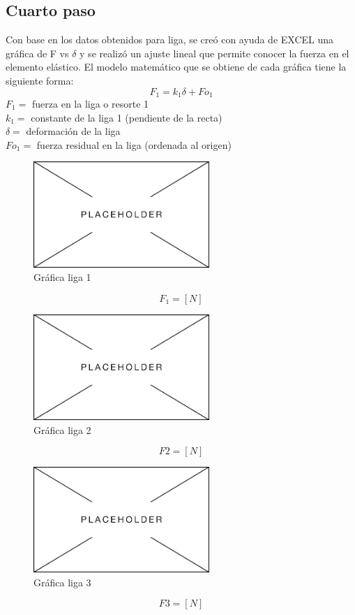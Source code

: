 \documentclass[12pt, titlepage]{report}
\begin{document}
    \subsection*{Cuarto paso}
    Con base en los datos obtenidos para liga, se creó con ayuda de EXCEL una gráfica de F vs $\delta$ y se realizó un ajuste lineal que permite conocer la fuerza en el elemento elástico. El modelo matemático que se obtiene de cada gráfica tiene la siguiente forma: 
    $$F_{1}=k_{1}\delta+Fo_{1}$$
    $F_{1}= $ fuerza en la liga o resorte 1 \\
    $k_{1}= $ constante de la liga 1 (pendiente de la recta) \\
    $\delta= $ deformación de la liga \\
    $Fo_{1}= $ fuerza residual en la liga (ordenada al origen)\\

    \begin{figure}[ht]
        \centering
        \includegraphics[height=4cm]{Placeholder.png}
        \caption{Gráfica liga 1}
    \end{figure}
    $$F_{1}= [N]$$
    \vspace*{1cm}

    \begin{figure}[ht]
        \centering
        \includegraphics[height=4cm]{Placeholder.png}
        \caption{Gráfica liga 2}
    \end{figure}
    $$F2= [N]$$
    \vspace*{.1cm}

    \begin{figure}[ht]
        \centering
        \includegraphics[height=4cm]{Placeholder.png}
        \caption{Gráfica liga 3}
    \end{figure}
    $$F3= [N]$$
    
\end{document}
